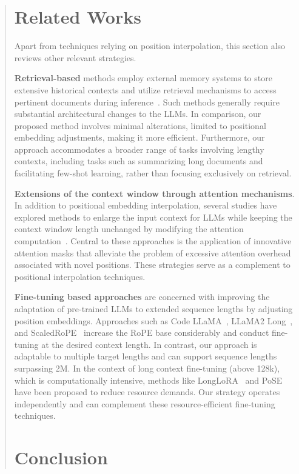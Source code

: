 \begin{abstract}
\section{Related Works}

Apart from techniques relying on position interpolation, this section also reviews other relevant strategies.

\textbf{Retrieval-based} methods employ external memory systems to store extensive historical contexts and utilize retrieval mechanisms to access pertinent documents during inference~\cite{longllama,wang2023augmenting,borgeaud2022improving}. Such methods generally require substantial architectural changes to the LLMs. In comparison, our proposed method involves minimal alterations, limited to positional embedding adjustments, making it more efficient. Furthermore, our approach accommodates a broader range of tasks involving lengthy contexts, including tasks such as summarizing long documents and facilitating few-shot learning, rather than focusing exclusively on retrieval.

\textbf{Extensions of the context window through attention mechanisms}. In addition to positional embedding interpolation, several studies have explored methods to enlarge the input context for LLMs while keeping the context window length unchanged by modifying the attention computation~\cite{han2023lminfinite, streamingllm,parallelwindow}. Central to these approaches is the application of innovative attention masks that alleviate the problem of excessive attention overhead associated with novel positions. These strategies serve as a complement to positional interpolation techniques.

\textbf{Fine-tuning based approaches} are concerned with improving the adaptation of pre-trained LLMs to extended sequence lengths by adjusting position embeddings. Approaches such as Code LLaMA~\cite{codellama}, LLaMA2 Long~\cite{xiong2023effective}, and ScaledRoPE~\cite{liu2023scaling} increase the RoPE base considerably and conduct fine-tuning at the desired context length. In contrast, our approach is adaptable to multiple target lengths and can support sequence lengths surpassing 2M. In the context of long context fine-tuning (above 128k), which is computationally intensive, methods like LongLoRA~\cite{longlora} and PoSE~\cite{zhu2023pose} have been proposed to reduce resource demands. Our strategy operates independently and can complement these resource-efficient fine-tuning techniques.

\section{Conclusion}


\end{abstract}
